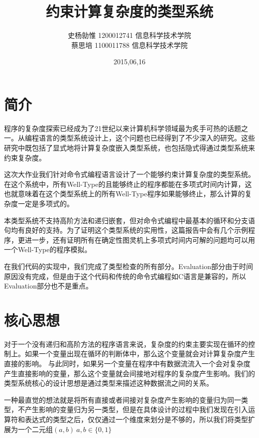 \documentclass{ctexart}
\begin{document}
\title{%
\vspace{-30mm}\heiti\Huge 约束计算复杂度的类型系统 \vspace{10mm}}
\author{%
\Large 史杨勍惟 1200012741 信息科学技术学院 \\
\Large 蔡思培  1100011788 信息科学技术学院}
\date{2015,06,16}


\maketitle

\section{简介}
程序的复杂度探索已经成为了21世纪以来计算机科学领域最为炙手可热的话题之一。从编程语言的类型系统设计上，这个问题也已经得到了不少深入的研究。这些研究中既包括了显式地将计算复杂度嵌入类型系统，也包括隐式得通过类型系统来约束复杂度。

这次大作业我们针对命令式编程语言设计了一个能够约束计算复杂度的类型系统。在这个系统中，所有Well-Type的且能够终止的程序都能在多项式时间内计算，这也就意味着在这个类型系统上的所有Well-Type程序如果能够终止，那么计算的复杂度一定是多项式的。

本类型系统不支持高阶方法和递归嵌套，但对命令式编程中最基本的循环和分支语句均有良好的支持。为了证明这个类型系统的实用性，这篇报告中会有几个示例程序，更进一步，还有证明所有在确定性图灵机上多项式时间内可解的问题均可以用一个Well-Type的程序模拟。

在我们代码的实现中，我们完成了类型检查的所有部分。Evaluation部分由于时间原因没有完成，但是由于这个代码和传统的命令式编程如C语言是兼容的，所以Evaluation部分也不是重点。

\section{核心思想}

对于一个没有递归和高阶方法的程序语言来说，复杂度的约束主要实现在循环的控制上。如果一个变量出现在循环的判断体中，那么这个变量就会对计算复杂度产生直接的影响。%
与此同时，如果另一个变量在程序中有数据流流入一个会对复杂度产生直接影响的变量，那么这个变量就会间接地对程序的复杂度产生影响。我们的类型系统核心的设计思想是通过类型来描述这种数据流之间的关系。

一种最直觉的想法就是将所有直接或者间接对复杂度产生影响的变量归为同一类型，不产生影响的变量归为另一类型，但是在具体设计的过程中我们发现在引入运算符和表达式的类型之后，仅仅通过一个维度来划分是不够的，所以我们将类型扩展为一个二元组$(a,b)~a,b\in \{0,1\}$
\end{document}
